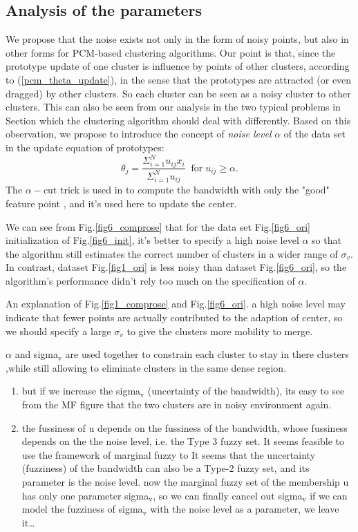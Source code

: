 \documentclass[journal]{IEEEtran}
\begin{document}
\subsection{Analysis of the parameters}
\label{sec-3-1}
We propose that the noise exists not only in the form of noisy points, but also in other forms for PCM-based clustering algorithms.
Our point is that, since the prototype update of one cluster is influence by points of other clusters, according to (\ref{pcm_theta_update}), in the sense that the prototypes are attracted (or even dragged) by other clusters. So each cluster can be seen as a noisy cluster to other clusters. This can also be seen from our analysis in the two typical problems in Section which the clustering algorithm should deal with differently. Based on this observation, we propose to introduce the concept of \emph{noise level} $\alpha$ of the data set in the update equation of prototypes:
\label{upcm_theta_update}
\begin{equation}
\theta_j=\frac{\Sigma_{i=1}^Nu_{ij}x_i}{\Sigma_{i=1}^Nu_{ij}}\;\; \text{for}\;u_{ij}\geq \alpha.
\end{equation}
The $\alpha-\text{cut}$ trick is used in \cite{krishnapuram_possibilistic_1993} to compute the bandwidth with only the "good" feature point , and it's used here to update the center. 

We can see from Fig.\ref{fig6_comprose} that for the data set Fig.\ref{fig6_ori} initialization of Fig.\ref{fig6_init}, it's better to specify a high noise level $\alpha$ so that the algorithm still estimates the correct number of clusters in a wider range of $\sigma_v$. In contrast, dataset Fig.\ref{fig1_ori} is less noisy than dataset Fig.\ref{fig6_ori}, so the algorithm's performance didn't rely too much on the specification of $\alpha$.

An explanation of Fig.\ref{fig1_comprose} and Fig.\ref{fig6_ori}. a high noise level may indicate that fewer points are actually contributed to the adaption of center, so we should specify a large $\sigma_v$ to give the clusters more mobility to merge.

$\alpha$ and sigma$_{\text{v}}$ are used together to constrain each cluster to stay in there clusters ,while still allowing to eliminate clusters in the same dense region.

\begin{enumerate}
\item but if we increase the sigma$_{\text{v}}$ (uncertainty of the bandwidth), its easy to see from the MF figure that the two clusters are in noisy environment again.
\item the fussiness of u depends on the fussiness of the bandwidth, whose fussiness depends on the the noise level, i.e. the Type 3 fuzzy set. It seems feasible to use the framework of marginal fuzzy to 
  It seems that the uncertainty (fuzziness) of the bandwidth can also be a Type-2 fuzzy set, and its parameter is the noise level.
now the marginal fuzzy set of the membership u has only one parameter sigma$_{\text{v}}$, so we can finally cancel out sigma$_{\text{v}}$ if we can model the fuzziness of sigma$_{\text{v}}$ with the noise level as a parameter, we leave it\ldots{}
\end{enumerate}
\end{document}
